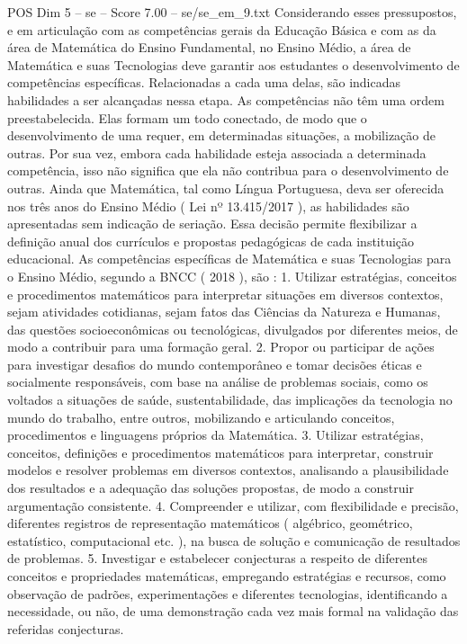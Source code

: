 \begin{textsample}{POS Dim 5 – se – Score 7.00 – se/se\_em\_9.txt}
Considerando esses pressupostos, e em articulação com as competências gerais da Educação Básica e com as da área de Matemática do Ensino Fundamental, no Ensino Médio, a área de Matemática e suas Tecnologias deve garantir aos estudantes o desenvolvimento de competências específicas.
Relacionadas a cada uma delas, são indicadas habilidades a ser alcançadas nessa etapa.
As competências não têm uma ordem preestabelecida.
Elas formam um todo conectado, de modo que o desenvolvimento de uma requer, em determinadas situações, a mobilização de outras.
Por sua vez, embora cada habilidade esteja associada a determinada competência, isso não significa que ela não contribua para o desenvolvimento de outras.
Ainda que Matemática, tal como Língua Portuguesa, deva ser oferecida nos três anos do Ensino Médio ( Lei nº 13.415/2017 ), as habilidades são apresentadas sem indicação de seriação.
Essa decisão permite flexibilizar a definição anual dos currículos e propostas pedagógicas de cada instituição educacional.
As competências específicas de Matemática e suas Tecnologias para o Ensino Médio, segundo a BNCC ( 2018 ), são : 1.
Utilizar estratégias, conceitos e procedimentos matemáticos para interpretar situações em diversos contextos, sejam atividades cotidianas, sejam fatos das Ciências da Natureza e Humanas, das questões socioeconômicas ou tecnológicas, divulgados por diferentes meios, de modo a contribuir para uma formação geral. 2.
Propor ou participar de ações para investigar desafios do mundo contemporâneo e tomar decisões éticas e socialmente responsáveis, com base na análise de problemas sociais, como os voltados a situações de saúde, sustentabilidade, das implicações da tecnologia no mundo do trabalho, entre outros, mobilizando e articulando conceitos, procedimentos e linguagens próprios da Matemática. 3.
Utilizar estratégias, conceitos, definições e procedimentos matemáticos para interpretar, construir modelos e resolver problemas em diversos contextos, analisando a plausibilidade dos resultados e a adequação das soluções propostas, de modo a construir argumentação consistente. 4.
Compreender e utilizar, com flexibilidade e precisão, diferentes registros de representação matemáticos ( algébrico, geométrico, estatístico, computacional etc. ), na busca de solução e comunicação de resultados de problemas. 5.
Investigar e estabelecer conjecturas a respeito de diferentes conceitos e propriedades matemáticas, empregando estratégias e recursos, como observação de padrões, experimentações e diferentes tecnologias, identificando a necessidade, ou não, de uma demonstração cada vez mais formal na validação das referidas conjecturas.

\end{textsample}

